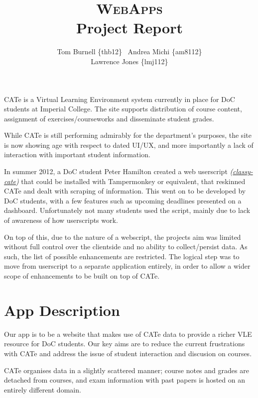 \documentclass[a4paper]{article}
\title{\textsc{WebApps}\\Project Report}
\author{Tom Burnell \{thb12\} \  Andrea Michi \{am8112\} \\
        Lawrence Jones \{lmj112\}}
\date{}
\begin{document}
\maketitle


CATe is a Virtual Learning Environment system currently in place for DoC students at Imperial College. The site supports distribution of course content, assignment of exercises/courseworks and disseminate student grades.

While CATe is still performing admirably for the department's purposes, the site is now showing age with respect to dated UI/UX, and more importantly a lack of interaction with important student information.

In summer 2012, a DoC student Peter Hamilton created a web userscript \textit{(\href{https://github.com/petehamilton/classy-cate}{classy-cate})} that could be installed with Tampermonkey or equivalent, that reskinned CATe and dealt with scraping of information. This went on to be developed by DoC students, with a few features such as upcoming deadlines presented on a dashboard. Unfortunately not many students used the script, mainly due to lack of awareness of how userscripts work.

On top of this, due to the nature of a webscript, the projects aim was limited without full control over the clientside and no ability to collect/persist data. As such, the list of possible enhancements are restricted. The logical step was to move from userscript to a separate application entirely, in order to allow a wider scope of enhancements to be built on top of CATe.


\section{App Description}

Our app is to be a website that makes use of CATe data to provide a richer VLE resource for DoC students. Our key aims are to reduce the current frustrations with CATe and address the issue of student interaction and discusion on courses.

CATe organises data in a slightly scattered manner; course notes and grades are detached from courses, and exam information with past papers is hosted on an entirely different domain.
\end{document}
